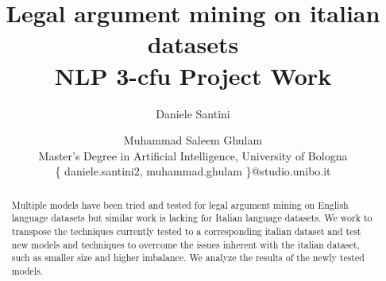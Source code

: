 \documentclass[11pt]{article}
\begin{document}
%
\title{Legal argument mining on italian datasets\\
\large {}
NLP 3-cfu Project Work 
}
\author{Daniele Santini
\and
Muhammad Saleem Ghulam \\
Master's Degree in Artificial Intelligence, University of Bologna\\
\{ daniele.santini2, muhammad.ghulam \}@studio.unibo.it
}
\maketitle



\begin{abstract}


Multiple models have been tried and tested for legal argument mining on English language datasets but similar work is lacking for Italian language datasets.
We work to transpose the techniques currently tested to a corresponding italian dataset and test new models and techniques to overcome the issues inherent with the italian dataset, such as smaller size and higher imbalance.
We analyze the results of the newly tested models.

\end{abstract}
\end{document}
